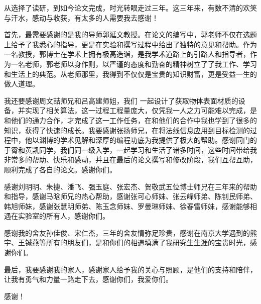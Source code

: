 \begin{acknowledgement}

从选择了读研，到如今论文完成，时光转眼走过三年。这三年来，有数不清的欢笑与汗水，感动与收获，有太多的人需要我去感谢！

首先，最需要感谢的是我的导师郭延文教授。在论文的编写中，郭老师不仅在选题上给予了我悉心的指导，更是在实验和撰写过程中给出了独特的意见和帮助。作为一名教授，郭博士在学术上拥有极高造诣，是我学术道路上的引路人和指导者，作为一名老师，郭老师以身作则，以严谨的态度和勤奋的精神树立了了我工作、学习和生活上的典范。从老师那里，我得到不仅仅是宝贵的知识财富，更是受益一生的做人道理。

我还要感谢周文喆师兄和吕高建师姐，我们 一起设计了获取物体表面材质的设备，并实现了相关算法，这一过程工程量庞大，仅凭我一人之力可能难以完成，是和他们的通力合作，才完成了这一工作任务，在和他们的合作中我也学到了很多的知识，获得了快速的成长。我要感谢张扬师兄，在将法线信息应用到目标检测的过程中，他以渊博的学术见解和深厚的编程功底为我提供了极大的帮助。感谢同门的于霄和黄凯同学，我们同一级入学，一起学习和生活了诸多时间，这些时间带给我非常多的帮助、快乐和感动，并且在最后的论文撰写和修改阶段，我们互帮互助，顺利完成了各自的论文。感谢你们。

感谢刘明明、朱捷、潘飞、强玉庭、张宏杰、贺敬武五位博士师兄在三年来的帮助和指导，感谢马晗师兄的热心帮助，感谢张可心师妹、张云峰师弟、陈钊民师弟、韩旭师妹，感谢张慧明师弟、陈玉念师妹、罗曼琳师妹、徐春雷师妹，感谢能够相遇在实验室的所有人，感谢你们。

感谢我的舍友孙佳俊、宋仁杰，三年的舍友情弥足珍贵，感谢在南京大学遇到的熊宇、王铖燕等所有的朋友们，是和你们的相遇填满了我研究生生涯的宝贵时光，感谢你们。

最后，我要感谢我的家人，感谢家人给予我的关心与照顾，是他们的支持和陪伴，让我有勇气和力量一路走下去，感谢你们，我爱你们。

感谢！




\end{acknowledgement}